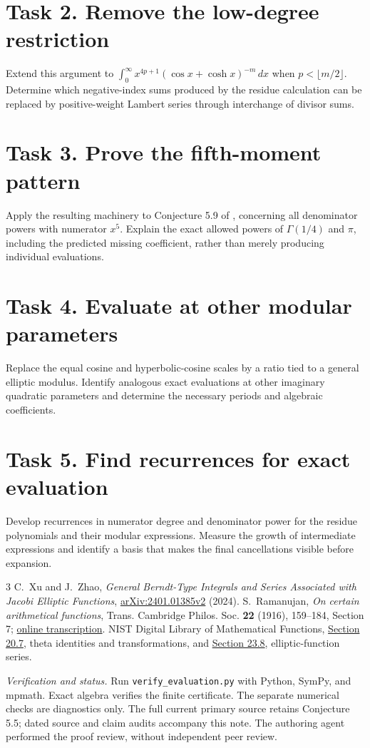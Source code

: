 \documentclass[11pt]{article}
\begin{document}
\section*{Task 2. Remove the low-degree restriction}
Extend this argument to $\int_0^\infty x^{4p+1}(\cos x+\cosh x)^{-m}\,dx$
when $p<\lfloor m/2\rfloor$. Determine which negative-index sums
produced by the residue calculation can be replaced by positive-weight
Lambert series through interchange of divisor sums.

\section*{Task 3. Prove the fifth-moment pattern}
Apply the resulting machinery to Conjecture 5.9 of \cite{XZ}, concerning
all denominator powers with numerator $x^5$. Explain the exact allowed
powers of $\Gamma(1/4)$ and $\pi$, including the predicted missing
coefficient, rather than merely producing individual evaluations.

\section*{Task 4. Evaluate at other modular parameters}
Replace the equal cosine and hyperbolic-cosine scales by a ratio tied
to a general elliptic modulus. Identify analogous exact evaluations
at other imaginary quadratic parameters and determine the necessary
periods and algebraic coefficients.

\section*{Task 5. Find recurrences for exact evaluation}
Develop recurrences in numerator degree and denominator power for the
residue polynomials and their modular expressions. Measure the growth
of intermediate expressions and identify a basis that makes the final
cancellations visible before expansion.

\begin{thebibliography}{3}
 C.~Xu and J.~Zhao,
\emph{General Berndt-Type Integrals and Series Associated with Jacobi
Elliptic Functions},
\href{https://arxiv.org/abs/2401.01385v2}{arXiv:2401.01385v2} (2024).
 S.~Ramanujan, \emph{On certain arithmetical functions},
Trans. Cambridge Philos. Soc. \textbf{22} (1916), 159--184,
Section 7; \href{https://ramanujan.sirinudi.org/Volumes/published/ram18.html}{online transcription}.
 NIST Digital Library of Mathematical Functions,
\href{https://dlmf.nist.gov/20.7}{Section 20.7}, theta identities and
transformations, and \href{https://dlmf.nist.gov/23.8}{Section 23.8},
elliptic-function series.
\end{thebibliography}
\noindent\textit{Verification and status.}
Run \texttt{verify\_evaluation.py} with Python, SymPy, and mpmath.
Exact algebra verifies the finite certificate. The separate numerical
checks are diagnostics only. The full current primary source retains
Conjecture 5.5; dated source and claim audits accompany this note.
The authoring agent performed the proof review, without independent
peer review.
\end{document}

